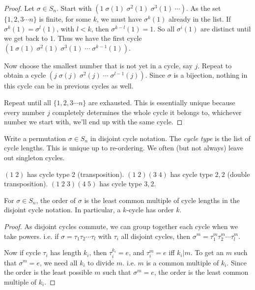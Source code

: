 \documentclass[a4pape]{article}
\begin{document}
\begin{proof}
  Let $\sigma\in S_n$. Start with $(1\; \sigma(1)\; \sigma^2(1)\; \sigma^3(1)\;\cdots)$. As the set $\{1, 2, 3\cdots n\}$ is finite, for some $k$, we must have $\sigma^k(1)$ already in the list. If $\sigma^k(1) = \sigma^l(1)$, with $l < k$, then $\sigma^{k-l}(1) = 1$. So all $\sigma^i(1)$ are distinct until we get back to $1$. Thus we have the first cycle $(1\; \sigma(1)\; \sigma^2(1)\; \sigma^3(1)\;\cdots\;\sigma^{k-1}(1))$.

Now choose the smallest number that is not yet in a cycle, say $j$. Repeat to obtain a cycle $(j\; \sigma(j)\; \sigma^2(j)\;\cdots\; \sigma^{l - 1}(j))$. Since $\sigma$ is a bijection, nothing in this cycle can be in previous cycles as well.

Repeat until all $\{1, 2, 3\cdots n\}$ are exhausted. This is essentially unique because every number $j$ completely determines the whole cycle it belongs to, whichever number we start with, we'll end up with the same cycle.
\end{proof}

\begin{defi}
  Write a permutation $\sigma\in S_n$ in disjoint cycle notation. The \emph{cycle type} is the list of cycle lengths. This is unique up to re-ordering. We often (but not always) leave out singleton cycles.
\end{defi}
\begin{eg}
  $(1\; 2)$ has cycle type $2$ (transposition). $(1\; 2)(3\; 4)$ has cycle type $2, 2$ (double transposition). $(1\; 2\; 3)(4\; 5)$ has cycle type $3, 2$.
\end{eg}
\begin{lemma}
  For $\sigma\in S_n$, the order of $\sigma$ is the least common multiple of cycle lengths in the disjoint cycle notation. In particular, a $k$-cycle has order $k$.
\end{lemma}

\begin{proof}
  As disjoint cycles commute, we can group together each cycle when we take powers. i.e. if $\sigma = \tau_1\tau_2\cdots\tau_l$ with $\tau_i$ all disjoint cycles, then $\sigma^m = \tau_1^m\tau_2^m\cdots\tau_l^m$.

Now if cycle $\tau_i$ has length $k_i$, then $\tau_i^{k_i} = e$, and $\tau_i^m = e$ iff $k_i | m$. To get an $m$ such that $\sigma^m = e$, we need all $k_i$ to divide $m$. i.e. $m$ is a common multiple of $k_i$. Since the order is the least possible $m$ such that $\sigma^m = e$, the order is the least common multiple of $k_i$.
\end{proof}
\end{document}
